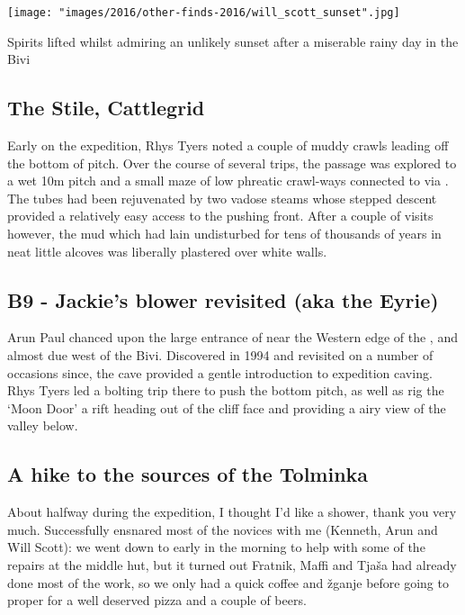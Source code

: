 \begin{marginfigure}
\checkoddpage \ifoddpage \forcerectofloat \else \forceversofloat \fi
\centering
 \texttt{[image: "images/2016/other-finds-2016/will\_scott\_sunset".jpg]} 
 \caption{Spirits lifted whilst admiring an unlikely sunset after a miserable rainy day in the Bivi }
 \label{Sunset}
\end{marginfigure}



\subsection{The Stile, Cattlegrid}
Early on the expedition, Rhys Tyers noted a couple of muddy crawls leading off the bottom of  pitch. Over the course of several trips, the  passage was explored to a wet 10m pitch and a small maze of low phreatic crawl-ways connected to  via . The tubes had been rejuvenated by two vadose steams whose stepped descent provided a relatively easy access to the pushing front. After a couple of visits however, the mud which had lain undisturbed for tens of thousands of years in neat little alcoves was liberally plastered over white walls.

\subsection{B9 - Jackie's blower revisited (aka the Eyrie)}
Arun Paul chanced upon the large entrance of  near the Western edge of the , and almost due west of the Bivi. Discovered in 1994 and revisited on a number of occasions since, the cave provided a gentle introduction to expedition caving. Rhys Tyers led a bolting trip there to push the bottom pitch, as well as rig the `Moon Door' a rift heading out of the cliff face and providing a airy view of the  valley below.

 \subsection{A hike to the sources of the Tolminka}
 About halfway during the expedition, I thought I'd like a shower, thank you very much. Successfully ensnared most of the novices with me (Kenneth, Arun and Will Scott): we went down to  early in the morning to help with some of the repairs at the middle hut, but it turned out Fratnik, Maffi and Tja\v{s}a had already done most of the work, so we only had a quick coffee and \v{z}ganje before going to  proper for a well deserved pizza and a couple of beers. 
 
